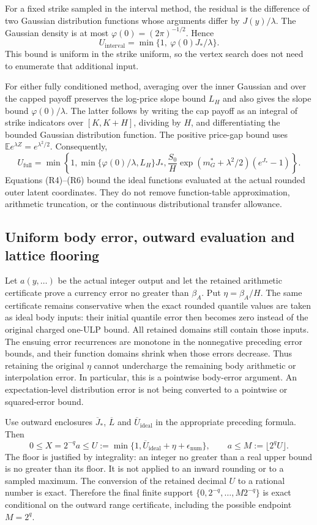 For a fixed strike sampled in the interval method, the residual is the
difference of two Gaussian distribution functions whose arguments differ
by \(J(y)/\lambda\). The Gaussian density is at most
\(\varphi(0)=(2\pi)^{-1/2}\). Hence
\[
 U_{\mathrm{interval}}=
 \min\{1,\ \varphi(0)J_*/\lambda\}.                       \tag{R5}
\]
This bound is uniform in the strike uniform, so the vertex search does not
need to enumerate that additional input.

For either fully conditioned method, averaging over the inner Gaussian
and over the capped payoff preserves the log-price slope bound \(L_H\)
and also gives the slope bound \(\varphi(0)/\lambda\).
The latter follows by writing the cap payoff as an integral of strike
indicators over \([K,K+H]\), dividing by \(H\), and differentiating
the bounded Gaussian distribution function. The positive price-gap bound
uses \(\mathbb E e^{\lambda Z}=e^{\lambda^2/2}\). Consequently,
\[
 U_{\mathrm{full}}=
 \min\left\{1,
   \min\{\varphi(0)/\lambda,L_H\}J_*,
   \frac{S_0}{H}\exp(m_G^*+\lambda^2/2)(e^{J_*}-1)\right\}.  \tag{R6}
\]
Equations (R4)--(R6) bound the ideal functions evaluated at the actual
rounded outer latent coordinates. They do not remove function-table
approximation, arithmetic truncation, or the continuous distributional
transfer allowance.

\subsection{Uniform body error, outward evaluation and lattice flooring}

Let \(a(y,\ldots)\) be the actual integer output and let the retained
arithmetic certificate prove a currency error no greater than \(\beta_A\).
Put \(\eta=\beta_A/H\). The same certificate remains conservative
when the exact rounded quantile values are taken as ideal body inputs:
their initial quantile error then becomes zero instead of the original
charged one-ULP bound. All retained domains still contain those inputs.
The ensuing error recurrences are monotone in the nonnegative preceding
error bounds, and their function domains shrink when those errors decrease.
Thus retaining the original \(\eta\) cannot undercharge the remaining
body arithmetic or interpolation error. In particular, this is a
pointwise body-error argument. An expectation-level distribution error is
not being converted to a pointwise or squared-error bound.

Use outward enclosures \(\overline J_*\), \(\overline L\) and
\(\overline U_{\mathrm{ideal}}\) in the appropriate preceding formula.
Then
\[
 0\leq X=2^{-q}a\leq
 U:=\min\{1,\overline U_{\mathrm{ideal}}+\eta+\epsilon_{\mathrm{num}}\},
 \qquad
 a\leq M:=\lfloor2^qU\rfloor.                            \tag{R7}
\]
The floor is justified by integrality: an integer no greater than a real
upper bound is no greater than its floor. It is not applied to an inward
rounding or to a sampled maximum. The conversion of the retained decimal
\(U\) to a rational number is exact. Therefore the final finite support
\(\{0,2^{-q},\ldots,M2^{-q}\}\) is exact conditional on the outward
range certificate, including the possible endpoint \(M=2^q\).

